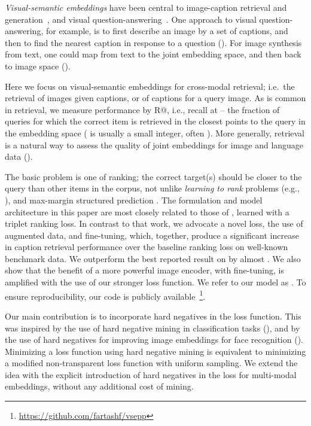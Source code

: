 {\em Visual-semantic embeddings} have been central to
image-caption retrieval and 
generation~\cite{kiros2014unifying,karpathy2015deep}, and visual 
question-answering~\cite{Malinowski15}.  One approach to visual 
question-answering, for example, is to first describe an image by a set of 
captions, and then to find the nearest caption in response to a question 
(\cite{agrawal2017vqa,zitnick2016measuring}). For image synthesis 
from text, one could map from text to the joint embedding space, and then
back to image space (\cite{reed2016generative,reed2016learning}).

Here we focus on visual-semantic embeddings for cross-modal retrieval; 
i.e.\ the retrieval of images given captions, 
or of captions for a query image.  As is common in retrieval, 
we measure performance by R@, i.e., recall at  -- the fraction of 
queries for which the correct item is retrieved in the closest  points 
to the query in the embedding space ( is usually a small integer, 
often ).  More generally, retrieval is a natural way to assess the 
quality of joint embeddings for image and language data (\cite{hodosh2013framing}).

The basic problem is one of ranking; the correct target(s) 
should be closer to the query than other items in the corpus, not unlike
{\em learning to rank}\/ problems (e.g., \cite{li2014learning}), and 
max-margin structured prediction \cite{chapelle2007large,le2007direct}.
The formulation and model architecture in this paper are most closely 
related to those of \cite{kiros2014unifying}, learned with a triplet ranking 
loss.  In contrast to that work, we advocate a novel loss, the use of 
augmented data, and fine-tuning, which, together, produce a significant 
increase in caption retrieval performance over the baseline ranking loss on 
well-known benchmark data.  We outperform the best reported result on 
\coco{} by almost .  We also show that the benefit of a more 
powerful image encoder, with fine-tuning, is amplified with 
the use of our stronger loss function.
We refer to our model as \VSEpp{}.
To ensure reproducibility, our code is publicly 
available~\footnote{\url{https://github.com/fartashf/vsepp}}.

Our main contribution is to incorporate hard negatives in the loss 
function.  This was inspired by the use of hard negative mining in 
classification tasks (\cite{dalal2005histograms, 
felzenszwalb2010object, malisiewicz2011ensemble}), and by the use of
hard negatives for improving image embeddings for face recognition 
(\cite{schroff2015facenet, wu2017sampling}). Minimizing a loss function using 
hard negative mining is equivalent to minimizing a modified non-transparent 
loss function with uniform sampling.  We extend the idea with the explicit 
introduction of hard negatives in the loss for multi-modal embeddings, 
without any additional cost of mining.

